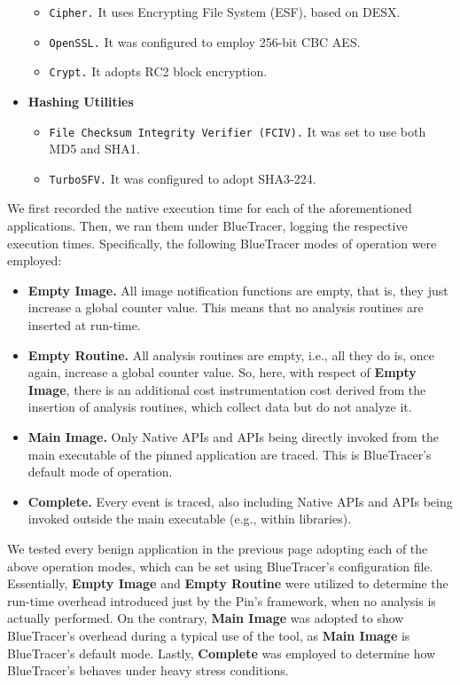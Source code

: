 \begin{itemize}
		\begin{itemize}
		\item \texttt{Cipher.} It uses Encrypting File System (ESF), based on DESX. 
		\item \texttt{OpenSSL.} It was configured to employ 256-bit CBC AES.
		\item \texttt{Crypt.} It adopts RC2 block encryption.
		\end{itemize}
\item \textbf{Hashing Utilities}
		\begin{itemize}
		\item \texttt{File Checksum Integrity Verifier (FCIV).} It was set to use both MD5 and SHA1.
		\item \texttt{TurboSFV.} It was configured to adopt SHA3-224. 
		\end{itemize}
\end{itemize}

We first recorded the native execution time for each of the aforementioned applications. Then, we ran them under BlueTracer, logging the respective execution times. Specifically, the following BlueTracer modes of operation were employed:

\begin{itemize}
\item \textbf{Empty Image.} All image notification functions are empty, that is, they just increase a global counter value. This means that no analysis routines are inserted at run-time. 
\item \textbf{Empty Routine.} All analysis routines are empty, i.e., all they do is, once again, increase a global counter value. So, here, with respect of \textbf{Empty Image}, there is an additional cost instrumentation cost derived from the insertion of analysis routines, which collect data but do not analyze it.  
\item \textbf{Main Image.} Only Native APIs and APIs being directly invoked from the main executable of the pinned application are traced. This is BlueTracer's default mode of operation. 
\item \textbf{Complete.} Every event is traced, also including Native APIs and APIs being invoked outside the main executable (e.g., within libraries).
\end{itemize}

We tested every benign application in the previous page adopting each of the above operation modes, which can be set using BlueTracer's configuration file. Essentially, \textbf{Empty Image} and \textbf{Empty Routine} were utilized to determine the run-time overhead introduced just by the Pin's framework, when no analysis is actually performed. On the contrary, \textbf{Main Image} was adopted to show BlueTracer's overhead during a typical use of the tool, as \textbf{Main Image} is BlueTracer's default mode. Lastly, \textbf{Complete} was employed to determine how BlueTracer's behaves under heavy stress conditions.

